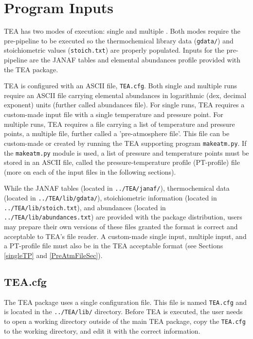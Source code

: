 {%
\section{Program Inputs}
\label{ProgInp}
  TEA has two modes of execution: single and multiple .
  Both modes require the pre-pipeline to be executed so the
  thermochemical library data (\texttt{gdata/}) and stoichiometric
  values \newline (\texttt{stoich.txt}) are properly populated. Inputs
  for the pre-pipeline are the JANAF tables and elemental abundances
  profile provided with the TEA package.

  TEA is configured with an ASCII file, \texttt{TEA.cfg}. Both single
  and multiple  runs require an ASCII file carrying
  elemental abundances in logarithmic (dex, decimal exponent) units
  (further called abundances file).  For single  runs, TEA
  requires a custom-made input file with a single temperature and
  pressure point.  For multiple  runs, TEA requires a file
  carrying a list of temperature and pressure points, a
  multiple  file, further called a 'pre-atmosphere file'.
  This file can be custom-made or created by running the TEA
  supporting program \texttt{makeatm.py}. If the \texttt{makeatm.py}
  module is used, a list of pressure and temperature points must be
  stored in an ASCII file, called the pressure-temperature profile
  (PT-profile) file (more on each of the input files in the following
  sections).

  While the JANAF tables (located in \texttt{../TEA/janaf/}),
  thermochemical data (located in \texttt{../TEA/lib/gdata/}),
  stoichiometric information (located in \texttt{../TEA/lib/stoich.txt}),
  and abundances (located in \texttt{../TEA/lib/abundances.txt}) are
  provided with the package distribution, users may prepare their own
  versions of these files granted the format is correct and acceptable
  to TEA's file reader. A custom-made single  input, 
  multiple  input, and a PT-profile file must also be in the
  TEA acceptable format (see Sections \ref{singleTP} and \ref{PreAtmFileSec}).
   

\subsection{TEA.cfg}
\label{TEAconf}
The TEA package uses a single configuration file.  This file is named
\texttt{TEA.cfg} and is located in the \texttt{../TEA/lib/} directory.
Before TEA is executed, the user needs to open a working directory
outside of the main TEA package, copy the \texttt{TEA.cfg} to the
working directory, and edit it with the correct information.

}
